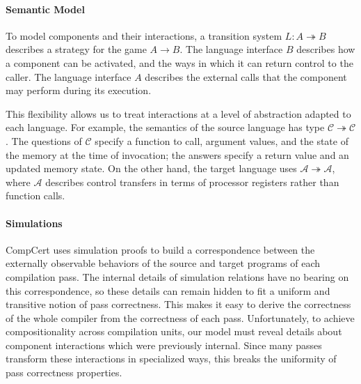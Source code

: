 \vspace*{-2ex}
\paragraph{Semantic Model} %
To model components and their interactions,
a transition system $L : A \twoheadrightarrow B$
describes a strategy
for the game
$A \rightarrow B$.
The language interface $B$ describes how a component can be activated,
and the ways in which it can return control to the caller.
The language interface $A$ describes the external calls that the component
may perform during its execution.

This flexibility allows us to treat interactions at a level of
abstraction adapted to each language.  For example, the semantics of
the source language  has type \mbox{$\mathcal{C}
  \twoheadrightarrow \mathcal{C}$}.  The questions of $\mathcal{C}$
specify a function to call, argument values, and the state of the
memory at the time of invocation; the answers specify a return value
and an updated memory state.  On the other hand, the target language
 uses $\mathcal{A} \twoheadrightarrow \mathcal{A}$, where
$\mathcal{A}$ describes control transfers in terms of processor
registers rather than function calls.



\vspace*{-2ex}
\paragraph{Simulations} %
CompCert uses simulation proofs
to build a correspondence between
the externally observable behaviors of
the source and target programs of each compilation pass.
The internal details of simulation relations
have no bearing on this correspondence,
so these details can remain hidden
to fit a uniform and transitive notion of pass correctness.
This makes it easy to derive the correctness
of the whole compiler
from the correctness of each pass.
%
Unfortunately,
to achieve compositionality across compilation units,
our model must reveal details
about component interactions
which were previously internal.
Since many passes transform
these interactions in
specialized ways,
this breaks the uniformity
of pass correctness properties.

